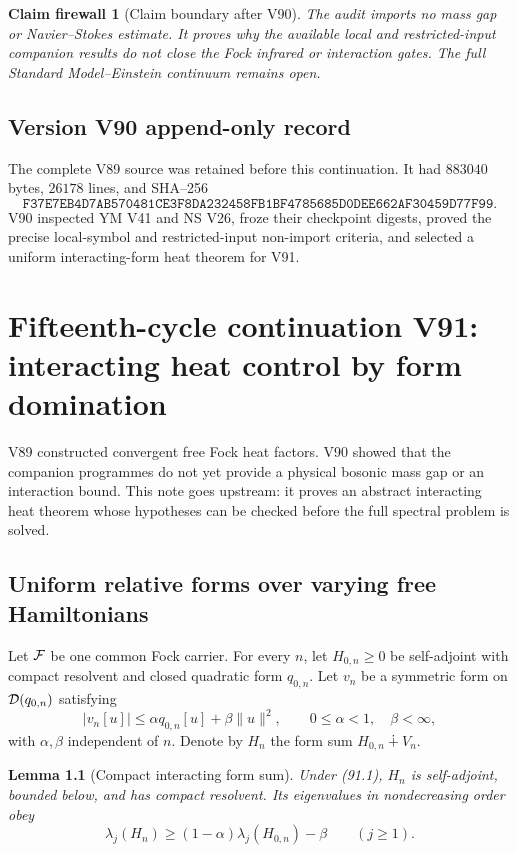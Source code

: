 \documentclass[11pt]{article}
\newtheorem{lemma}[theorem]{Lemma}
\newtheorem{firewall}[theorem]{Claim firewall}
\theoremstyle{remark}
\begin{document}
\begin{firewall}[Claim boundary after V90]
\label{fire:v15v90}
The audit imports no mass gap or Navier--Stokes estimate.  It proves
why the available local and restricted-input companion results do
not close the Fock infrared or interaction gates.  The full
Standard Model--Einstein continuum remains open.
\end{firewall}

\section*{Version V90 append-only record}
The complete V89 source was retained before this continuation.  It
had \(883040\) bytes, \(26178\) lines, and SHA--256
\[
 \texttt{F37E7EB4D7AB570481CE3F8DA232458FB1BF4785685D0DEE662AF30459D77F99}.
\]
V90 inspected YM V41 and NS V26, froze their checkpoint digests,
proved the precise local-symbol and restricted-input non-import
criteria, and selected a uniform interacting-form heat theorem for
V91.
\chapter{Fifteenth-cycle continuation V91: interacting heat control by form domination}
\label{sec:v15v91}

V89 constructed convergent free Fock heat factors.  V90 showed that
the companion programmes do not yet provide a physical bosonic mass
gap or an interaction bound.  This note goes upstream: it proves an
abstract interacting heat theorem whose hypotheses can be checked
before the full spectral problem is solved.

\section{Uniform relative forms over varying free Hamiltonians}

Let \({\cal F}\) be one common Fock carrier.  For every \(n\), let
\(H_{0,n}\geq0\) be self-adjoint with compact resolvent and closed
quadratic form \(q_{0,n}\).  Let \(v_n\) be a symmetric form on
\({\cal D}(q_{0,n})\) satisfying
\[
 |v_n[u]|
 \leq \alpha q_{0,n}[u]+\beta\|u\|^2,
 \qquad 0\leq\alpha<1,\quad \beta<\infty,              \tag{91.1}
\]
with \(\alpha,\beta\) independent of \(n\).  Denote by \(H_n\) the
form sum \(H_{0,n}\dotplus V_n\).

\begin{lemma}[Compact interacting form sum]
\label{lem:v15v91-klmn}
Under (91.1), \(H_n\) is self-adjoint, bounded below, and has compact
resolvent.  Its eigenvalues in nondecreasing order obey
\[
 \lambda_j(H_n)
 \geq(1-\alpha)\lambda_j(H_{0,n})-\beta
 \qquad(j\geq1).                                      \tag{91.2}
\]
\end{lemma}
\end{document}
